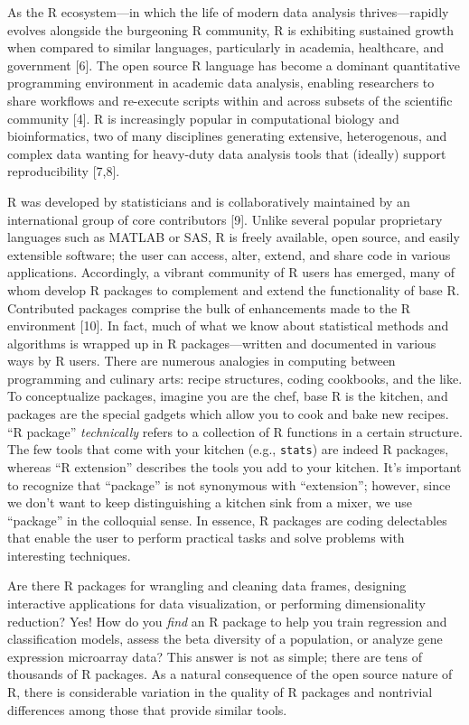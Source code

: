 \documentclass[10pt,letterpaper]{article}
\begin{document}
As the R ecosystem---in which the life of modern data analysis
thrives---rapidly evolves alongside the burgeoning R community, R is
exhibiting sustained growth when compared to similar languages,
particularly in academia, healthcare, and government {[}6{]}. The open
source R language has become a dominant quantitative programming
environment in academic data analysis, enabling researchers to share
workflows and re-execute scripts within and across subsets of the
scientific community {[}4{]}. R is increasingly popular in computational
biology and bioinformatics, two of many disciplines generating
extensive, heterogenous, and complex data wanting for heavy-duty data
analysis tools that (ideally) support reproducibility {[}7,8{]}.

R was developed by statisticians and is collaboratively maintained by an
international group of core contributors {[}9{]}. Unlike several popular
proprietary languages such as MATLAB or SAS, R is freely available, open
source, and easily extensible software; the user can access, alter,
extend, and share code in various applications. Accordingly, a vibrant
community of R users has emerged, many of whom develop R packages to
complement and extend the functionality of base R. Contributed packages
comprise the bulk of enhancements made to the R environment {[}10{]}. In
fact, much of what we know about statistical methods and algorithms is
wrapped up in R packages---written and documented in various ways by R
users. There are numerous analogies in computing between programming and
culinary arts: recipe structures, coding cookbooks, and the like. To
conceptualize packages, imagine you are the chef, base R is the kitchen,
and packages are the special gadgets which allow you to cook and bake
new recipes. ``R package'' \emph{technically} refers to a collection of
R functions in a certain structure. The few tools that come with your
kitchen (e.g., \texttt{stats}) are indeed R packages, whereas ``R
extension'' describes the tools you add to your kitchen. It's important
to recognize that ``package'' is not synonymous with ``extension'';
however, since we don't want to keep distinguishing a kitchen sink from
a mixer, we use ``package'' in the colloquial sense. In essence, R
packages are coding delectables that enable the user to perform
practical tasks and solve problems with interesting techniques.

Are there R packages for wrangling and cleaning data frames, designing
interactive applications for data visualization, or performing
dimensionality reduction? Yes! How do you \emph{find} an R package to
help you train regression and classification models, assess the beta
diversity of a population, or analyze gene expression microarray data?
This answer is not as simple; there are tens of thousands of R packages.
As a natural consequence of the open source nature of R, there is
considerable variation in the quality of R packages and nontrivial
differences among those that provide similar tools.
\end{document}
